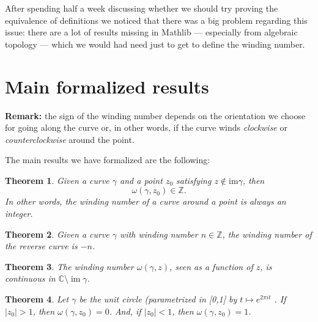 \documentclass[a4paper,12pt]{article}
\newcommand{\imm}{\operatorname{im}}
\newtheorem{theorem}{Theorem}
\begin{document}
After spending half a week discussing whether we should try proving the equivalence of definitions we
noticed that there was a big problem regarding this issue: there are a lot of results missing in Mathlib
--- especially from algebraic topology --- which we would had need just to get to define the winding number.

\section{Main formalized results}

\noindent \textbf{Remark:} the sign of the winding number depends on the orientation we choose for going along
the curve or, in other words, if the curve winds \textit{clockwise} or \textit{counterclockwise} around the point.

The main results we have formalized are the following:
\begin{theorem}
    Given a curve $\gamma$ and a point $z_0$ satisfying $z \notin \text{im} \gamma$, then
    $$\omega(\gamma, z_0) \in \mathbb{Z}.$$
    In other words, the winding number of a curve around a point is always an integer.
\end{theorem}

\begin{theorem}
  Given a curve $\gamma$ with winding number $n \in \mathbb{Z}$, the winding number of the reverse curve
  is $-n$.
\end{theorem}

\begin{theorem}
  The winding number $\omega(\gamma, z)$, seen as a function of $z$, is continuous in $\mathbb{C}\setminus \imm \gamma$.
\end{theorem}

\begin{theorem}
Let $\gamma$ be the unit circle (parametrized in [0,1] by $t \mapsto e^{2\pi i t}$ . If $|z_0| > 1$, then 
$\omega(\gamma, z_0) = 0$. And, if $|z_0| < 1$, then $\omega (\gamma, z_0) = 1$.
\end{theorem}
\end{document}
